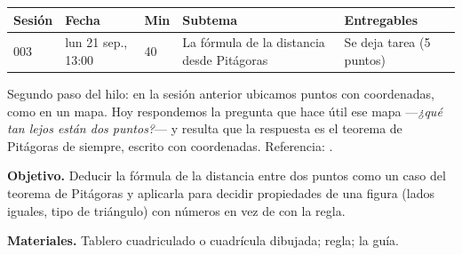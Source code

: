 \documentclass[11pt]{article}
\begin{document}
\encabezado*

\begin{center}
{\renewcommand{\arraystretch}{1.3}
\begin{tabularx}{\linewidth}{@{}l l l X l@{}}
  \toprule
  \textbf{Sesión} & \textbf{Fecha} & \textbf{Min} & \textbf{Subtema} & \textbf{Entregables}\\
  \midrule
  003 & lun 21 sep., 13:00 & 40 & La fórmula de la distancia desde Pitágoras
      & Se deja tarea (5 puntos)\\
  \bottomrule
\end{tabularx}}
\end{center}

Segundo paso del hilo: en la sesión anterior ubicamos puntos con coordenadas, como en un mapa.
Hoy respondemos la pregunta que hace útil ese mapa —\emph{¿qué tan lejos están dos puntos?}—
y resulta que la respuesta es el teorema de Pitágoras de siempre, escrito con coordenadas.
Referencia: .


\textbf{Objetivo.} Deducir la fórmula de la distancia entre dos puntos como un caso del
teorema de Pitágoras y aplicarla para decidir propiedades de una figura (lados iguales,
tipo de triángulo) con números en vez de con la regla.

\textbf{Materiales.} Tablero cuadriculado o cuadrícula dibujada; regla; la guía.
\end{document}

